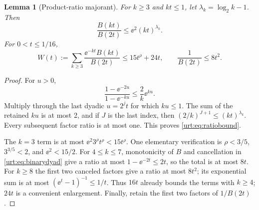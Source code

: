 \documentclass[11pt,letterpaper]{article}
\newtheorem{lemma}[theorem]{Lemma}\newtheorem{proposition}[theorem]{Proposition}\newtheorem{corollary}[theorem]{Corollary}
\theoremstyle{remark}\newtheorem{remark}[theorem]{Remark}
\begin{document}
\begin{lemma}[Product-ratio majorant]\label{urt:lem:ratio}
For $k\ge3$ and $kt\le1$, let $\lambda_k=\log_2k-1$. Then
\begin{equation}\label{urt:eq:ratiobound}
 \frac{B(kt)}{B(2t)}\le\ee^2(kt)^{\lambda_k}.
\end{equation}
For $0<t\le1/16$,
\begin{equation}\label{urt:eq:Wbound}
 W(t):=\sum_{k\ge3}\frac{\ee^{-kt}B(kt)}{B(2t)}
       \le15t^\rho+24t,\qquad \frac1{B(2t)}\le8t^2.
\end{equation}
\end{lemma}
\begin{proof}
For $u>0$,
\[
 \frac{1-\ee^{-2u}}{1-\ee^{-ku}}\le\frac2k\ee^{ku}.
\]
Multiply through the last dyadic $u=2^jt$ for which $ku\le1$. The sum of the retained $ku$ is at most 2, and if $J$ is the last index, then $(2/k)^{J+1}\le(kt)^{\lambda_k}$. Every subsequent factor ratio is at most one. This proves \eqref{urt:eq:ratiobound}.

The $k=3$ term is at most $\ee^2 3^\rho t^\rho<15t^\rho$. One elementary verification is $\rho<3/5$, $3^{3/5}<2$, and $\ee^2<15/2$. For $4\le k\le7$, monotonicity of $B$ and cancellation in \eqref{urt:eq:binarydyad} give a ratio at most $1-\ee^{-2t}\le2t$, so the total is at most $8t$. For $k\ge8$ the first two canceled factors give a ratio at most $8t^2$; its exponential sum is at most $(\ee^t-1)^{-1}\le1/t$. Thus $16t$ already bounds the terms with $k\ge4$; $24t$ is a convenient enlargement. Finally, retain the first two factors of $1/B(2t)$.
\end{proof}
\end{document}
